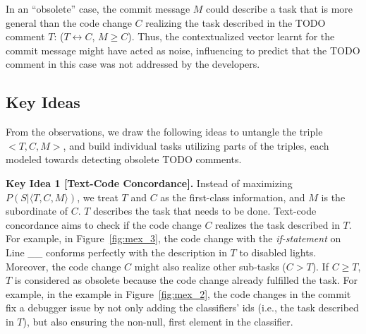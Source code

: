  In an ``obsolete'' case, the commit
message $M$ could describe a task that is more general than the code
change $C$ realizing the task described in the TODO comment $T$: ($T
\leftrightarrow C$, $M \geq C$).  Thus, the contextualized vector
learnt for the commit message might have acted as noise, influencing
\tdcleaner to predict that the TODO comment in this case was not
addressed by the developers.


\subsection{Key Ideas}
\label{ideas:sec}

From the observations, we draw the following ideas to untangle the
triple $<T, C, M>$, and build individual tasks utilizing parts of the
triples, each modeled towards detecting obsolete TODO comments.


{\bf Key Idea 1 [Text-Code Concordance].} Instead of maximizing $P(S |
\langle T, C, M \rangle)$, we treat $T$ and $C$ as the first-class
information, and $M$ is the subordinate of $C$. $T$ describes the task
that needs to be done. Text-code concordance aims to check if the code
change $C$ realizes the task described in $T$. For example, in
Figure~\ref{fig:mex_3}, the code change with the {\em if-statement} on
Line \_\_ conforms perfectly with the description in $T$ to disabled
lights.
%
Moreover, the code change $C$ might also realize other sub-tasks ($C >
T$). If $C \geq T$, $T$ is considered as obsolete because the code
change already fulfilled the task. For example, in the example in
Figure~\ref{fig:mex_2}, the code changes in the commit fix a debugger
issue by not only adding the classifiers' ids (i.e., the task
described in $T$), but also ensuring the non-null, first element in
the classifier.

